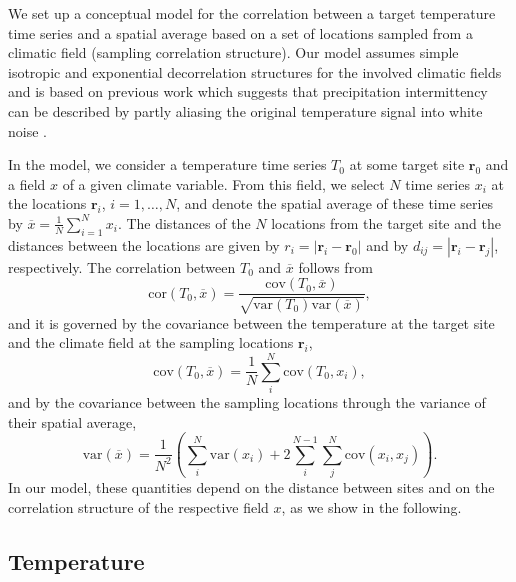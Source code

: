 \documentclass[cp, manuscript]{copernicus}
\begin{document}
We set up a conceptual model for the correlation between a target temperature
time series and a spatial average based on a set of locations sampled from a
climatic field (sampling correlation structure). Our model assumes simple
isotropic and exponential decorrelation structures for the involved climatic
fields and is based on previous work which suggests that precipitation
intermittency can be described by partly aliasing the original temperature
signal into white noise \citep{Laepple2018}.

In the model, we consider a temperature time series $T_0$ at some target site
$\mathbf{r}_0$ and a field $x$ of a given climate variable. From this field, we
select $N$ time series $x_i$ at the locations $\mathbf{r}_i$, $i=1,\dotsc,N$,
and denote the spatial average of these time series by
$\overline{x}=\frac{1}{N}\sum_{i=1}^{N}{x_i}$. The distances of the $N$
locations from the target site and the distances between the locations are given
by $r_i=|\mathbf{r}_i-\mathbf{r}_0|$ and by
$d_{ij}=|{\mathbf{r}_i-\mathbf{r}_j}|$, respectively. The correlation between
$T_0$ and $\overline{x}$ follows from
%
\begin{equation}
\label{eq:corr.general}
\mathrm{cor}(T_0,\overline{x})=\frac
{\mathrm{cov}(T_0,\overline{x})}
{\sqrt{\mathrm{var}(T_0)\mathrm{var}(\overline{x})}},
\end{equation}
%
and it is governed by the covariance between the temperature at the target site
and the climate field at the sampling locations $\mathbf{r}_i$,
%
\begin{equation}
\label{eq:cov.general}
\mathrm{cov}(T_0,\overline{x})=
\frac{1}{N}\sum_{i}^{N}{\mathrm{cov}(T_0,x_i)},
\end{equation}
%
and by the covariance between the sampling locations through the variance of
their spatial average,
\begin{equation}
\label{eq:var.general}
\mathrm{var}(\overline{x})=
\frac{1}{N^2}\left(
\sum_{i}^{N}{\mathrm{var}(x_i)} +
2\sum_{i}^{N-1}\sum_{j}^{N}{\mathrm{cov}(x_i,x_j)}
\right).
\end{equation}
%
In our model, these quantities depend on the distance between sites and on the
correlation structure of the respective field $x$, as we show in the following.

\subsection{Temperature}
\label{app:concept.model.t2m}
\end{document}
